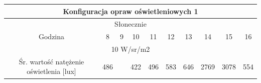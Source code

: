 \documentclass[a4paper,12pt]{article}
\begin{document}
\begin{table}[!ht]
\begin{tabular}{|c|c|c|c|c|c|c|c|c|c|}
\hline
\multicolumn{10}{|c|}{\cellcolor[HTML]{C8DFC8}Konfiguracja opraw oświetleniowych 1}                                                                                                                                                                                                                                                                                                                                                                                                                                                                                \\ \hline
\multicolumn{10}{|c|}{\cellcolor[HTML]{EDD9A0}Słonecznie}                                                                                                                                                                                                                                                                                                                                                                                                                                                                                                          \\ \hline
Godzina                                                               & \cellcolor[HTML]{FFFFFF}8                          & \cellcolor[HTML]{FFFFFF}9                          & \cellcolor[HTML]{FFFFFF}10                         & \cellcolor[HTML]{FFFFFF}11                         & \cellcolor[HTML]{FFFFFF}12                         & \cellcolor[HTML]{FFFFFF}13                         & \cellcolor[HTML]{FFFFFF}14                         & \cellcolor[HTML]{FFFFFF}15                         & \cellcolor[HTML]{FFFFFF}16                         \\ \hline
\multicolumn{10}{|c|}{10 W/sr/m2}                                                                                                                                                                                                                                                                                                                                                                                                                                                                                                                                  \\ \hline
Śr. wartość natężenie oświetlenia {[}lux{]}                       & \cellcolor[HTML]{F6E9C3}486                        & \cellcolor[HTML]{FFCCC9}{\color[HTML]{000000} 398} & \cellcolor[HTML]{F6E9C3}422                        & \cellcolor[HTML]{F6E9C3}496                        & \cellcolor[HTML]{F6E9C3}583                        & \cellcolor[HTML]{F6E9C3}646                        & \cellcolor[HTML]{F6E9C3}2769                       & \cellcolor[HTML]{F6E9C3}3078                       & \cellcolor[HTML]{F6E9C3}554                        \\ \hline

\end{tabular}
\end{table}
\end{document}
